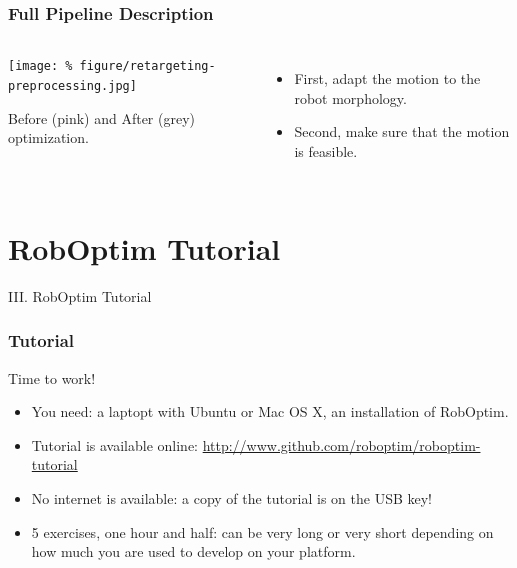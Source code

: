 \begin{frame}
  \frametitle{Full Pipeline Description}

  \begin{columns}
    \column{.45\paperwidth}
    \begin{center}
      \texttt{[image: \%
        figure/retargeting-preprocessing.jpg]}
      \par
      \small
      Before (pink) and After (grey) optimization.
    \end{center}

    \column{.45\paperwidth}

    \begin{itemize}
    \item First, adapt the motion to the robot morphology.
    \item Second, make sure that the motion is feasible.
    \end{itemize}
    
  \end{columns}
\end{frame}




\section{RobOptim Tutorial}
\begin{frame}
   \vfill
   \begin{center}
     \Large III. RobOptim Tutorial
   \end{center}
   \vfill
\end{frame}

\begin{frame}
  \frametitle{Tutorial}

  Time to work!

  \begin{itemize}
  \item You need: a laptopt with Ubuntu or Mac OS X, an installation of RobOptim.
  \item Tutorial is available online: \url{http://www.github.com/roboptim/roboptim-tutorial}
  \item No internet is available: a copy of the tutorial is on the USB key!
  \item 5 exercises, one hour and half: can be very long or very short
    depending on how much you are used to develop on your platform.
  \end{itemize}
\end{frame}



